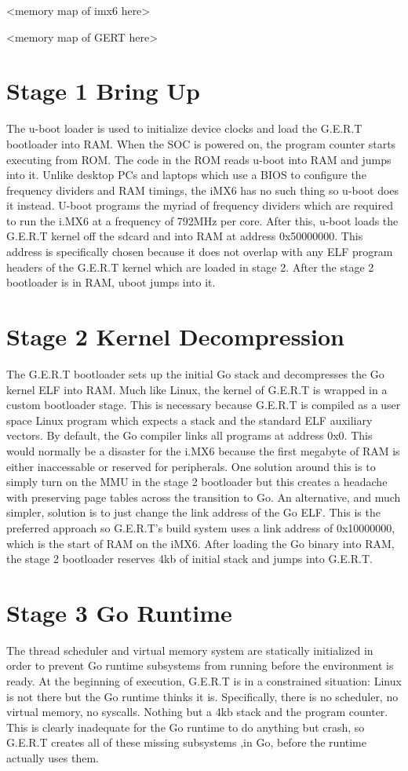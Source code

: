 <memory map of imx6 here>

<memory map of GERT here>

\section{Stage 1 Bring Up}
The u-boot loader is used to initialize device clocks and load the G.E.R.T bootloader into RAM.
When the SOC is powered on, the program counter starts executing from ROM. The code in the ROM reads
u-boot into RAM and jumps into it. Unlike desktop PCs and laptops which use a BIOS to configure the
frequency dividers and RAM timings, the iMX6 has no such thing so u-boot does it instead.
U-boot programs the myriad of frequency dividers which are required
to run the i.MX6 at a frequency of 792MHz per core. After this, u-boot loads the G.E.R.T
kernel off the sdcard and into RAM at address 0x50000000. This address is specifically chosen because it
does not overlap with any ELF program headers of the G.E.R.T kernel which are loaded in stage 2. After
the stage 2 bootloader is in RAM, uboot jumps into it.

\section{Stage 2 Kernel Decompression}
The G.E.R.T bootloader sets up the initial Go stack and decompresses the Go kernel
ELF into RAM. Much like Linux, the kernel of G.E.R.T is wrapped in a custom
bootloader stage. This is necessary because G.E.R.T is compiled as a user space
Linux program which expects a stack and the standard ELF auxiliary vectors. By
default, the Go compiler links all programs at address 0x0. This would normally
be a disaster for the i.MX6 because the first megabyte of RAM is either inaccessable
or reserved for peripherals. One solution around this is to simply turn on the MMU
in the stage 2 bootloader but this creates a headache with preserving page tables
across the transition to Go. An alternative, and much simpler, solution is to
just change the link address of the Go ELF. This is the preferred approach so
G.E.R.T's build system uses a link address of 0x10000000, which is the start of
RAM on the iMX6. After loading the Go binary into RAM, the stage 2 bootloader reserves
4kb of initial stack and jumps into G.E.R.T.

\section{Stage 3 Go Runtime}
The thread scheduler and virtual memory system are statically initialized
in order to prevent Go runtime subsystems from running before the environment
is ready. At the beginning of execution, G.E.R.T is in a constrained
situation: Linux is not there but the Go runtime thinks it is. Specifically, there
is no scheduler, no virtual memory, no syscalls. Nothing but a 4kb stack
and the program counter. This is clearly inadequate for the Go runtime
to do anything but crash, so G.E.R.T creates all of these missing subsystems
,in Go, before the runtime actually uses them.


